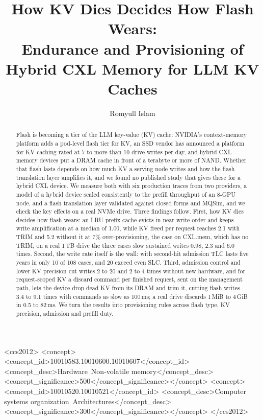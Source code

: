 \documentclass[acmsmall,screen,review]{acmart}
\begin{document}
\title{How KV Dies Decides How Flash Wears:\texorpdfstring{\\}{ }
Endurance and Provisioning of Hybrid CXL Memory for LLM KV Caches}

\author{Romyull Islam}

\begin{abstract}
Flash is becoming a tier of the LLM key-value (KV) cache: NVIDIA's context-memory platform adds a
pod-level flash tier for KV, an SSD vendor has announced a platform for KV caching rated at 7 to more
than 10 drive writes per day, and hybrid CXL memory devices put a DRAM cache in front of a terabyte
or more of NAND. Whether that flash lasts depends on how much KV a serving node writes and how the
flash translation layer amplifies it, and we found no published study that gives these for a
hybrid CXL device.
We measure both with six production traces from two providers, a model of a hybrid device scaled
consistently to the prefill throughput of an 8-GPU node, and a flash translation layer validated
against closed forms and MQSim, and we check the key effects on a real NVMe drive. Three findings follow. First, how KV dies decides how flash wears: an
LRU prefix cache evicts in near write order and keeps write amplification at a median of 1.00, while
KV freed per request reaches 2.1 with TRIM and 5.2 without it at 7\% over-provisioning, the case on
CXL.mem, which has no TRIM; on a real 1\,TB drive the three cases slow sustained writes 0.98, 2.3 and
6.0 times. Second, the write rate itself is the wall: with second-hit admission TLC
lasts five years in only 10 of 108 cases, and 20 exceed even SLC. Third, admission control and lower KV
precision cut writes 2 to 20 and 2 to 4 times without new hardware, and for request-scoped KV a discard command per finished request,
sent on the management path, lets the device drop dead KV from its DRAM and trim it, cutting flash
writes 3.4 to 9.1 times with commands as slow as 100\,ms; a real drive discards 1\,MiB to 4\,GiB in
0.5 to 82\,ms. We turn the results into provisioning rules across flash type, KV precision, admission
and prefill duty.
\end{abstract}

\begin{CCSXML}
<ccs2012>
<concept><concept_id>10010583.10010600.10010607</concept_id>
<concept_desc>Hardware~Non-volatile memory</concept_desc><concept_significance>500</concept_significance></concept>
<concept><concept_id>10010520.10010521</concept_id>
<concept_desc>Computer systems organization~Architectures</concept_desc><concept_significance>300</concept_significance></concept>
</ccs2012>
\end{CCSXML}
\end{document}
